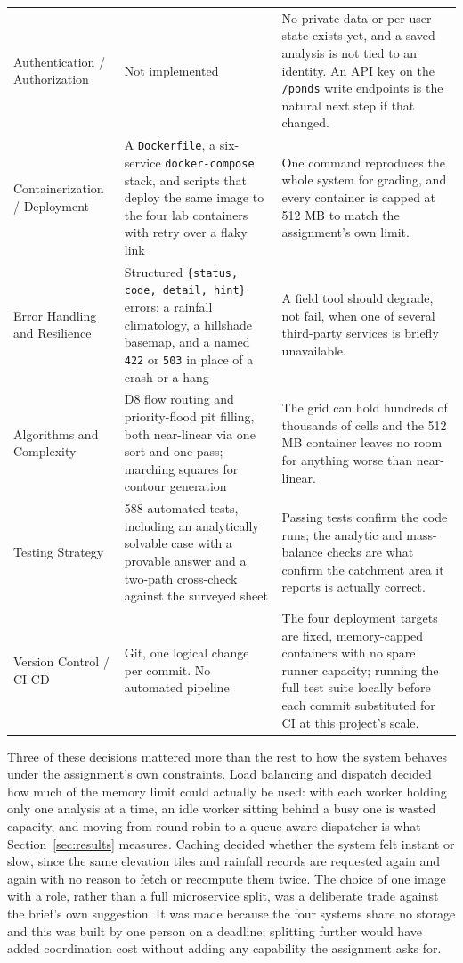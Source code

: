 \documentclass[manuscript,screen,review]{acmart}
\begin{document}
\begin{table}[t]
\begin{tabular}{p{2.6cm}p{4.9cm}p{6.1cm}}
    Authentication / Authorization & Not implemented & No private data or per-user state exists yet, and a saved analysis is not tied to an identity. An API key on the \texttt{/ponds} write endpoints is the natural next step if that changed. \\
    Containerization / Deployment & A \texttt{Dockerfile}, a six-service \texttt{docker-compose} stack, and scripts that deploy the same image to the four lab containers with retry over a flaky link & One command reproduces the whole system for grading, and every container is capped at 512 MB to match the assignment's own limit. \\
    Error Handling and Resilience & Structured \texttt{\{status, code, detail, hint\}} errors; a rainfall climatology, a hillshade basemap, and a named \texttt{422} or \texttt{503} in place of a crash or a hang & A field tool should degrade, not fail, when one of several third-party services is briefly unavailable. \\
    Algorithms and Complexity & D8 flow routing and priority-flood pit filling, both near-linear via one sort and one pass; marching squares for contour generation & The grid can hold hundreds of thousands of cells and the 512 MB container leaves no room for anything worse than near-linear. \\
    Testing Strategy & 588 automated tests, including an analytically solvable case with a provable answer and a two-path cross-check against the surveyed sheet & Passing tests confirm the code runs; the analytic and mass-balance checks are what confirm the catchment area it reports is actually correct. \\
    Version Control / CI-CD & Git, one logical change per commit. No automated pipeline & The four deployment targets are fixed, memory-capped containers with no spare runner capacity; running the full test suite locally before each commit substituted for CI at this project's scale. \\
    \bottomrule
  \end{tabular}
\end{table}

Three of these decisions mattered more than the rest to how the system behaves under
the assignment's own constraints. Load balancing and dispatch decided how much of the
memory limit could actually be used: with each worker holding only one analysis at a
time, an idle worker sitting behind a busy one is wasted capacity, and moving from
round-robin to a queue-aware dispatcher is what Section~\ref{sec:results} measures.
Caching decided whether the system felt instant or slow, since the same elevation
tiles and rainfall records are requested again and again with no reason to fetch or
recompute them twice. The choice of one image with a role, rather than a full
microservice split, was a deliberate trade against the brief's own suggestion. It was
made because the four systems share no storage and this was built by one person on a
deadline; splitting further would have added coordination cost without adding any
capability the assignment asks for.
\end{document}

